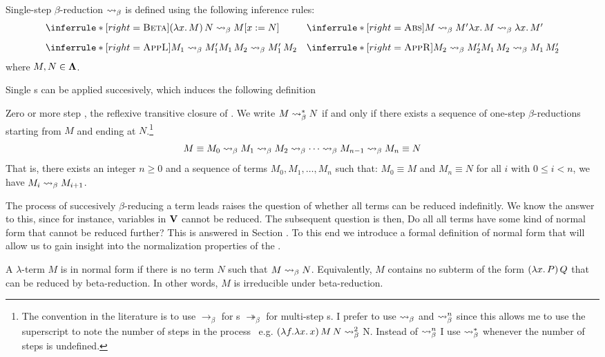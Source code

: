 \begin{definition} Single-step $\beta$-reduction $\mathrel{\leadsto}_\beta$ is defined using the following inference rules:
\[
\begin{array}{@{}l@{\quad}l@{}}
  \inferrule*[right=\textsc{Beta}]
    { }
    { (\lam{x}{M})\,N \step M\subst{x}{N} }
  &
  \inferrule*[right=\textsc{Abs}]
    { M \step M' }
    { \lam{x}{M} \step \lam{x}{M'} } \\[2ex]
  \inferrule*[right=\textsc{AppL}]
    { M_1 \step M_1' }
    { M_1\,M_2 \step M_1'\,M_2 }
  &
  \inferrule*[right=\textsc{AppR}]
    { M_2 \step M_2' }
    { M_1\,M_2 \step M_1\,M_2' }
\end{array}
\]
where \( M, N \in \mathbf{\Lambda} \).
\end{definition} 
Single \bred s can be applied succesively, which induces the following definition
\begin{definition} Zero or more step \bred, the reflexive transitive closure of \bred. We write $M \mathrel{\leadsto}_\beta^* N$ if and only if there exists a sequence of one-step $\beta$-reductions starting from $M$ and ending at $N$.\footnote{The convention in the literature is to use $\rightarrow_\beta$ for \bred s $\twoheadrightarrow_\beta$ for multi-step \bred s. I prefer to use $\mathrel{\leadsto}_\beta$ and $\mathrel{\leadsto}_\beta^n$ since this allows me to use the superscript to note the number of steps in the process \bred \ e.g. $ (\lambda f. \lambda x . \, x) \, M \, N \mathrel{\leadsto}_\beta^2 $ N. Instead of $\mathrel{\leadsto}_\beta^n$ I use $\mathrel{\leadsto}_\beta^*$ whenever the number of steps is undefined.}
  \label{def:zero-more-bred}
  \[
    M \equiv M_0 \mathrel{\leadsto}_\beta M_1 \mathrel{\leadsto}_\beta M_2 \mathrel{\leadsto}_\beta \cdots \mathrel{\leadsto}_\beta M_{n-1} \mathrel{\leadsto}_\beta M_n \equiv N
  \]
  That is, there exists an integer $n \geq 0$ and a sequence of terms $M_0, M_1, \dots, M_n$ such that: $ M_0 \equiv M $ and $ M_n \equiv N $ for all $ i $ with $ 0 \leq i < n $, we have $ M_i \mathrel{\leadsto}_\beta M_{i+1} $.
\end{definition}
The process of succesively $\beta$-reducing a term leads raises the question of whether all terms can be reduced indefinitly. We know the answer to this, since for instance, variables in $\mathbf{V}$ cannot be reduced. The subsequent question is then, Do all all terms have some kind of normal form that cannot be reduced further? This is answered in Section . To this end we introduce a formal definition of normal form that will allow us to gain insight into the normalization properties of the \lcalc.

\begin{definition} A \(\lambda\)-term \(M\) is in normal form if there is no term \(N\) such that \( M \mathrel{\leadsto}_\beta N \). Equivalently, \(M\) contains no subterm of the form \( (\lambda x . \, P) \, Q \) that can be reduced by beta-reduction. In other words, \(M\) is irreducible under beta-reduction.
\end{definition}

